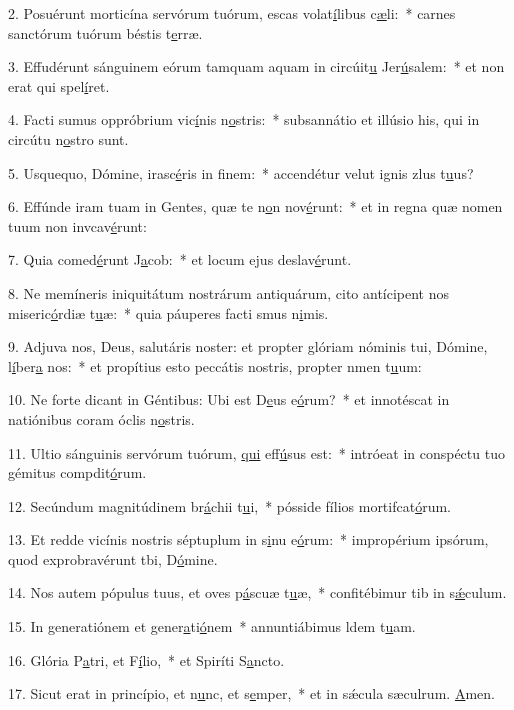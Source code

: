 2. Posuérunt morticína servórum tuórum, escas volat\uline{í}libus c\uline{æ}li:~* carnes sanctórum tuórum béstis t\uline{e}rræ.\par 
3. Effudérunt sánguinem eórum tamquam aquam in circúit\uline{u} Jer\uline{ú}salem:~* et non erat qui spel\uline{í}ret.\par 
4. Facti sumus oppróbrium vic\uline{í}nis n\uline{o}stris:~* subsannátio et illúsio his, qui in circútu n\uline{o}stro sunt.\par 
5. Usquequo, Dómine, irasc\uline{é}ris in f\uline{i}nem:~* accendétur velut ignis zlus t\uline{u}us?\par 
6. Effúnde iram tuam in Gentes, quæ te n\uline{o}n nov\uline{é}runt:~* et in regna quæ nomen tuum non invcav\uline{é}runt:\par 
7. Quia comed\uline{é}runt J\uline{a}cob:~* et locum ejus deslav\uline{é}runt.\par 
8. Ne memíneris iniquitátum nostrárum antiquárum, cito antícipent nos miseric\uline{ó}rdiæ t\uline{u}æ:~* quia páuperes facti smus n\uline{i}mis.\par 
9. Adjuva nos, Deus, salutáris noster: et propter glóriam nóminis tui, Dómine, l\uline{í}ber\uline{a} nos:~* et propítius esto peccátis nostris, propter nmen t\uline{u}um:\par 
10. Ne forte dicant in Géntibus: Ubi est D\uline{e}us e\uline{ó}rum?~* et innotéscat in natiónibus coram óclis n\uline{o}stris.\par 
11. Ultio sánguinis servórum tuórum, \uline{qui} eff\uline{ú}sus est:~* intróeat in conspéctu tuo gémitus compdit\uline{ó}rum.\par 
12. Secúndum magnitúdinem br\uline{á}chii t\uline{u}i,~* pósside fílios mortifcat\uline{ó}rum.\par 
13. Et redde vicínis nostris séptuplum in s\uline{i}nu e\uline{ó}rum:~* impropérium ipsórum, quod exprobravérunt tbi, D\uline{ó}mine.\par 
14. Nos autem pópulus tuus, et oves p\uline{á}scuæ t\uline{u}æ,~* confitébimur tib in s\uline{ǽ}culum.\par 
15. In generatiónem et gener\uline{a}ti\uline{ó}nem~* annuntiábimus ldem t\uline{u}am.\par 
16. Glória P\uline{a}tri, et F\uline{í}lio,~* et Spiríti S\uline{a}ncto.\par 
17. Sicut erat in princípio, et n\uline{u}nc, et s\uline{e}mper,~* et in sǽcula sæculrum. \uline{A}men.\par 
